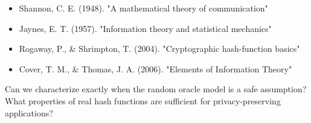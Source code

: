 \begin{itemize}
    \item Shannon, C. E. (1948). "A mathematical theory of communication"
    \item Jaynes, E. T. (1957). "Information theory and statistical mechanics"
    \item Rogaway, P., \& Shrimpton, T. (2004). "Cryptographic hash-function basics"
    \item Cover, T. M., \& Thomas, J. A. (2006). "Elements of Information Theory"
\end{itemize}

\begin{researchfrontier}
Can we characterize exactly when the random oracle model is a safe assumption? What properties of real hash functions are sufficient for privacy-preserving applications?
\end{researchfrontier}